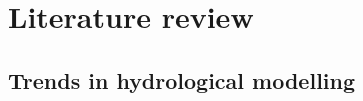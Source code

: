 \documentclass{icldt}\usepackage[]{graphicx}\usepackage[]{color}
\begin{document}

\newpage
\section{Literature review}

\subsection{Trends in hydrological modelling}


\end{document}
